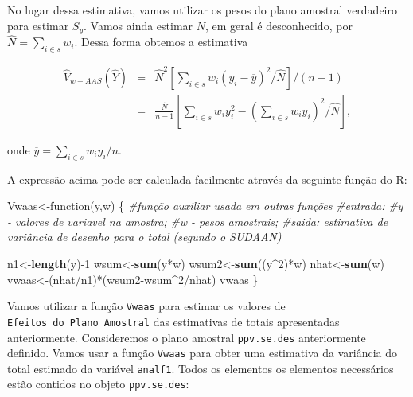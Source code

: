 \documentclass[]{book}
\newenvironment{Shaded}{\begin{snugshade}}{\end{snugshade}}
\newcommand{\KeywordTok}[1]{\textcolor[rgb]{0.13,0.29,0.53}{\textbf{{#1}}}}
\newcommand{\DecValTok}[1]{\textcolor[rgb]{0.00,0.00,0.81}{{#1}}}
\newcommand{\StringTok}[1]{\textcolor[rgb]{0.31,0.60,0.02}{{#1}}}
\newcommand{\CommentTok}[1]{\textcolor[rgb]{0.56,0.35,0.01}{\textit{{#1}}}}
\newcommand{\NormalTok}[1]{{#1}}
\numberwithin{example}{chapter}
\numberwithin{remark}{chapter}
\numberwithin{definition}{chapter}
\begin{document}
No lugar dessa estimativa, vamos utilizar os pesos do plano amostral
verdadeiro para estimar \(S_y\). Vamos ainda estimar \(N\), em geral é
desconhecido, por \(\widehat{N}=\sum_{i \in s} w_i\). Dessa forma
obtemos a estimativa

\begin{eqnarray*}
\widehat{V}_{w-AAS}\left(\widehat{Y}\right)&=& \widehat{N}^2\left[\sum_{i \in s}w_i\left(y_i-\overline{y}\right)^2/\widehat{N}\right]/(n-1)\\
&=&\frac{\widehat{N}}{n-1}\left[\sum_{i \in s}w_iy_i^2-\left(\sum_{i \in s}w_iy_i\right)^2/\widehat{N}\right],
\end{eqnarray*}

onde \(\overline{y}=\sum_{i \in s}w_iy_i/n\).

A expressão acima pode ser calculada facilmente através da seguinte
função do R:

\begin{Shaded}
\begin{Highlighting}[]
\NormalTok{Vwaas<-function(y,w)}
\NormalTok{\{}
\CommentTok{#função auxiliar usada em outras funções}
\CommentTok{#entrada:}
\CommentTok{#y - valores de variavel na amostra;}
\CommentTok{#w - pesos amostrais;}
\CommentTok{#saida:  estimativa de variância de desenho para o total (segundo o SUDAAN)}

\NormalTok{n1<-}\KeywordTok{length}\NormalTok{(y)-}\DecValTok{1}
\NormalTok{wsum<-}\KeywordTok{sum}\NormalTok{(y*w)}
\NormalTok{wsum2<-}\KeywordTok{sum}\NormalTok{((y^}\DecValTok{2}\NormalTok{)*w)}
\NormalTok{nhat<-}\KeywordTok{sum}\NormalTok{(w)}
\NormalTok{vwaas<-(nhat/n1)*(wsum2-wsum^}\DecValTok{2}\NormalTok{/nhat)}
\NormalTok{vwaas}
\NormalTok{\}}
\end{Highlighting}
\end{Shaded}

Vamos utilizar a função \texttt{Vwaas} para estimar os valores de
\texttt{Efeitos\ do\ Plano\ Amostral} das estimativas de totais
apresentadas anteriormente. Consideremos o plano amostral
\texttt{ppv.se.des} anteriormente definido. Vamos usar a função
\texttt{Vwaas} para obter uma estimativa da variância do total estimado
da variável \texttt{analf1}. Todos os elementos os elementos necessários
estão contidos no objeto \texttt{ppv.se.des}:

\begin{Shaded}
\end{Shaded}
\end{document}

